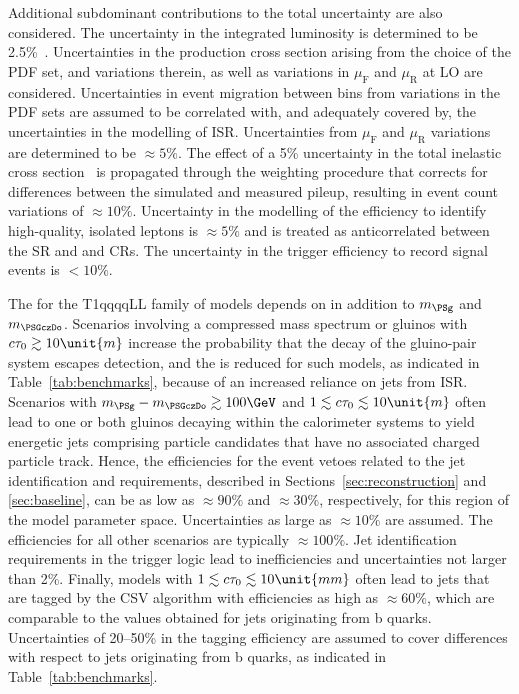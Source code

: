 Additional subdominant contributions to the total uncertainty are also
considered. The uncertainty in the integrated luminosity is determined
to be 2.5\%~\cite{CMS:2017sdi}. Uncertainties in the production cross
section arising from the choice of the PDF set, and variations
therein, as well as variations in $\mu_\mathrm{F}$ and $\mu_\mathrm{R}$ at
LO are considered. Uncertainties in event migration between bins from
variations in the PDF sets are assumed to be correlated with, and
adequately covered by, the uncertainties in the modelling of
ISR. Uncertainties from $\mu_\mathrm{F}$ and $\mu_\mathrm{R}$ variations
are determined to be ${\approx}5\%$. The effect of a 5\% uncertainty
in the total inelastic cross section~\cite{Aaboud:2016mmw} is
propagated through the weighting procedure that corrects for
differences between the simulated and measured pileup, resulting in
event count variations of ${\approx}10\%$. Uncertainty in the
modelling of the efficiency to identify high-quality, isolated leptons
is ${\approx}5\%$ and is treated as anticorrelated between the SR and
\mj and \mmj CRs. The uncertainty in the trigger efficiency to record
signal events is ${<}10\%$.

The \ate for the T1qqqqLL family of models depends on \ctau in
addition to $m_\PSg$ and $m_{\PSGczDo}$. Scenarios involving a
compressed mass spectrum or gluinos with $\ctau \gtrsim 10\unit{m}$
increase the probability that the decay of the gluino-pair system
escapes detection, and the \ate is reduced for such models, as
indicated in Table~\ref{tab:benchmarks}, because of an increased
reliance on jets from ISR. Scenarios with $m_\PSg - m_{\PSGczDo}
\gtrsim 100\GeV$ and $1 \lesssim \ctau \lesssim 10\unit{m}$ often lead
to one or both gluinos decaying within the calorimeter systems to
yield energetic jets comprising particle candidates that have no
associated charged particle track. Hence, the efficiencies for the
event vetoes related to the jet identification and \fhleadjet
requirements, described in Sections~\ref{sec:reconstruction} and
\ref{sec:baseline}, can be as low as ${\approx}90\%$ and
${\approx}30\%$, respectively, for this region of the model parameter
space. Uncertainties as large as ${\approx}10\%$ are assumed. The
efficiencies for all other scenarios are typically
${\approx}100\%$. Jet identification requirements in the trigger logic
lead to inefficiencies and uncertainties not larger than 2\%. Finally,
models with $1 \lesssim \ctau \lesssim 10\unit{mm}$ often lead to jets
that are tagged by the CSV algorithm with efficiencies as high as
${\approx}60\%$, which are comparable to the values obtained for jets
originating from b quarks. Uncertainties of 20--50\% in the tagging
efficiency are assumed to cover differences with respect to jets
originating from b quarks, as indicated in Table~\ref{tab:benchmarks}.

